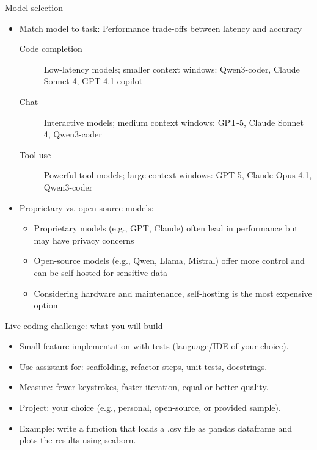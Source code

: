 \documentclass[
  aspectratio=1610,
]{beamer}
\begin{document}
\begin{frame}{Model selection}
  \begin{itemize}
    \item Match model to task: Performance trade-offs between latency and accuracy
          \begin{description}
            \item[Code completion] Low-latency models; smaller context windows: Qwen3-coder, Claude Sonnet 4, GPT-4.1-copilot
            \item[Chat] Interactive models; medium context windows: GPT-5, Claude Sonnet 4, Qwen3-coder
            \item[Tool-use] Powerful tool models; large context windows: GPT-5, Claude Opus 4.1, Qwen3-coder
          \end{description}
    \item Proprietary vs. open-source models:
          \begin{itemize}
            \item Proprietary models (e.g., GPT, Claude) often lead in performance but may have privacy concerns
            \item Open-source models (e.g., Qwen, Llama, Mistral) offer more control and can be self-hosted for sensitive data
            \item Considering hardware and maintenance, self-hosting is the most expensive option
          \end{itemize}
  \end{itemize}
\end{frame}


\begin{frame}{Live coding challenge: what you will build}
  \begin{itemize}
    \item Small feature implementation with tests (language/IDE of your choice).
    \item Use assistant for: scaffolding, refactor steps, unit tests, docstrings.
    \item Measure: fewer keystrokes, faster iteration, equal or better quality.
    \item Project: your choice (e.g., personal, open-source, or provided sample).
    \item Example: write a function that loads a .csv file as pandas dataframe and plots the results using seaborn.
  \end{itemize}
\end{frame}
\end{document}
